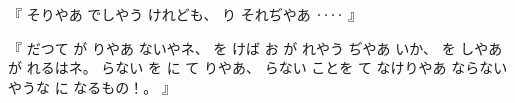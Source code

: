 %
『
そりやあ
でしやう
けれども、
%
り
それぢやあ
‥‥
』

%
『
だつて
が
りやあ
ないやネ、
%
を
けば
お
が
れやう
ぢやあ
いか、
%
を
しやあ
が
れるはネ。
%
らない
を
に
て
りやあ、
%
らない
ことを
て
なけりやあ
ならない
やうな
に
なるもの！。
』
